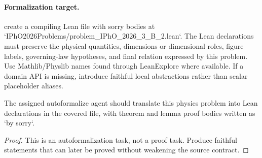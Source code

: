 \paragraph{Formalization target.}
create a compiling Lean file with sorry bodies at `IPhO2026Problems/problem\_IPhO\_2026\_3\_B\_2.lean`.
The Lean declarations must preserve the physical quantities, dimensions or dimensional roles, figure labels, governing-law hypotheses, and final relation expressed by this problem.
Use Mathlib/Physlib names found through LeanExplore where available. If a domain API is missing, introduce faithful local abstractions rather than scalar placeholder aliases.

\begin{theorem}
\label{thm:physics:IPhO_2026_3_B_2:target}
The assigned autoformalize agent should translate this physics problem into Lean declarations in the covered file, with theorem and lemma proof bodies written as `by sorry`.
\end{theorem}
\begin{proof}
This is an autoformalization task, not a proof task. Produce faithful statements that can later be proved without weakening the source contract.
\end{proof}


